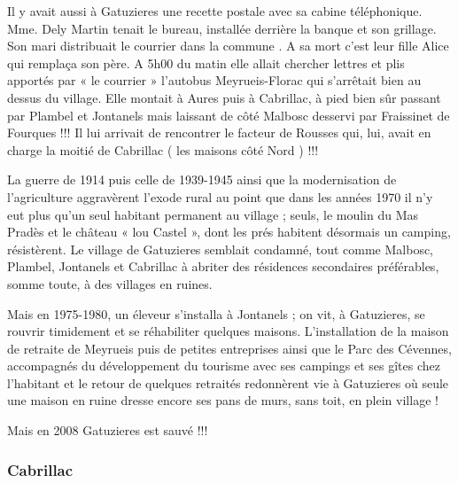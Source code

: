Il y avait aussi à Gatuzieres une recette postale avec sa cabine téléphonique. Mme. Dely
Martin tenait le bureau, installée derrière la banque et son grillage. Son mari distribuait le
courrier dans la commune . A sa mort c’est leur fille Alice qui remplaça son père. A 5h00 du
matin elle allait chercher lettres et plis apportés par « le courrier » l’autobus Meyrueis-Florac
qui s’arrêtait bien au dessus du village. Elle montait à Aures puis à Cabrillac, à pied bien sûr
passant par Plambel et Jontanels mais laissant de côté Malbosc desservi par Fraissinet de
Fourques !!! Il lui arrivait de rencontrer le facteur de Rousses qui, lui, avait en charge la
moitié de Cabrillac ( les maisons côté Nord ) !!!

\vspace{0.3cm}

La guerre de 1914 puis celle de 1939-1945 ainsi que la modernisation de l’agriculture
aggravèrent l’exode rural au point que dans les années 1970 il n’y eut plus qu’un seul habitant
permanent au village ; seuls, le moulin du Mas Pradès et le château « lou Castel », dont les
prés habitent désormais un camping, résistèrent.
Le village de Gatuzieres semblait condamné, tout comme Malbosc, Plambel, Jontanels et Cabrillac à
abriter des résidences secondaires préférables, somme toute, à des villages en ruines.

\vspace{0.3cm}

Mais en 1975-1980, un éleveur s’installa à Jontanels ; on vit, à Gatuzieres, se rouvrir
timidement et se réhabiliter quelques maisons. L’installation de la maison de retraite de
Meyrueis puis de petites entreprises ainsi que le Parc des Cévennes, accompagnés du
développement du tourisme avec ses campings et ses gîtes chez l’habitant et le retour de
quelques retraités redonnèrent vie à Gatuzieres où seule une maison en ruine dresse encore ses
pans de murs, sans toit, en plein village !

\vspace{0.35cm}

\begin{center}
    Mais en 2008 Gatuzieres est sauvé !!!
\end{center}

\subsubsection{Cabrillac}

    \vspace{0.15cm}


